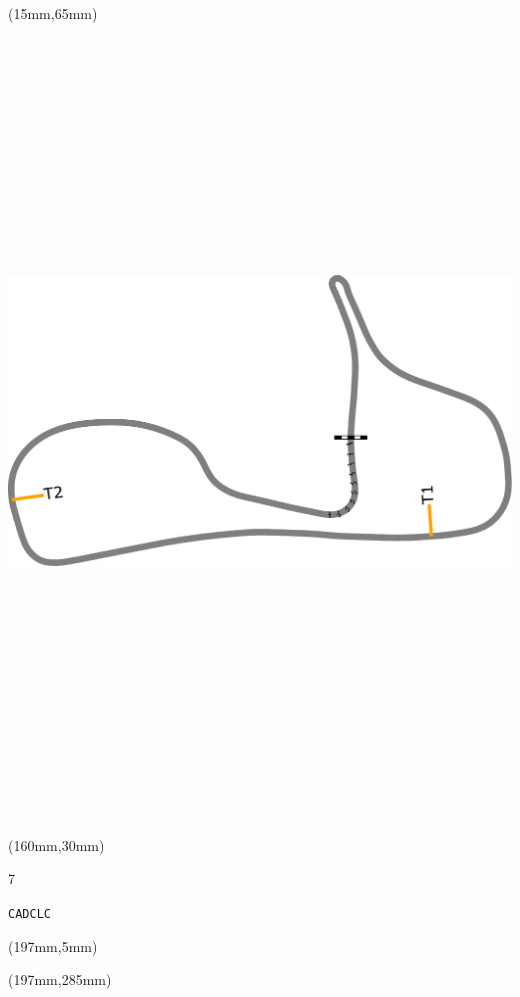\begin{textblock*}{185mm}(15mm,65mm)%
\centering
\mbox{\includegraphics[width=185mm,height=210mm,keepaspectratio]{PT/CADCLC.pdf}}
\end{textblock*}
\begin{textblock*}{40mm}(160mm,30mm)%
\Large
\par{} 
\par7 
\par\hfill\tiny\tt CADCLC\\
\end{textblock*}
\begin{textblock*}{20mm}(197mm,5mm)%
\fbox{\thepage}
\label{CADCLC}
\end{textblock*}
\begin{textblock*}{20mm}(197mm,285mm)%
\fbox{\thepage}
\end{textblock*}

